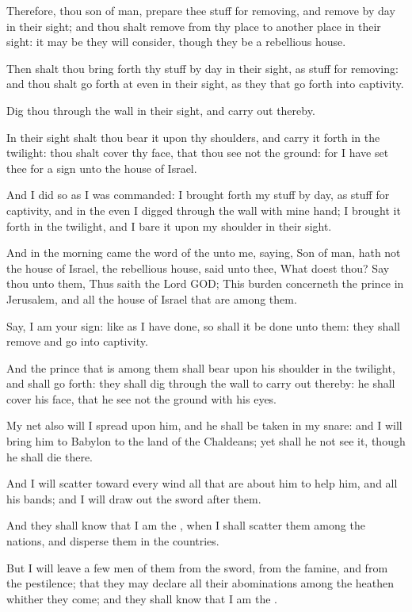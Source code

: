 \verse Therefore, thou son of man, prepare thee stuff for removing, and remove by day in their sight; and thou shalt remove from thy place to another place in their sight: it may be they will consider, though they be a rebellious house.

\verse Then shalt thou bring forth thy stuff by day in their sight, as stuff for removing: and thou shalt go forth at even in their sight, as they that go forth into captivity.

\verse Dig thou through the wall in their sight, and carry out thereby.

\verse In their sight shalt thou bear it upon thy shoulders, and carry it forth in the twilight: thou shalt cover thy face, that thou see not the ground: for I have set thee for a sign unto the house of Israel.

\verse And I did so as I was commanded: I brought forth my stuff by day, as stuff for captivity, and in the even I digged through the wall with mine hand; I brought it forth in the twilight, and I bare it upon my shoulder in their sight.

\verse And in the morning came the word of the \LORD unto me, saying, \verse Son of man, hath not the house of Israel, the rebellious house, said unto thee, What doest thou?  \verse Say thou unto them, Thus saith the Lord GOD; This burden concerneth the prince in Jerusalem, and all the house of Israel that are among them.

\verse Say, I am your sign: like as I have done, so shall it be done unto them: they shall remove and go into captivity.

\verse And the prince that is among them shall bear upon his shoulder in the twilight, and shall go forth: they shall dig through the wall to carry out thereby: he shall cover his face, that he see not the ground with his eyes.

\verse My net also will I spread upon him, and he shall be taken in my snare: and I will bring him to Babylon to the land of the Chaldeans; yet shall he not see it, though he shall die there.

\verse And I will scatter toward every wind all that are about him to help him, and all his bands; and I will draw out the sword after them.

\verse And they shall know that I am the \LORD, when I shall scatter them among the nations, and disperse them in the countries.

\verse But I will leave a few men of them from the sword, from the famine, and from the pestilence; that they may declare all their abominations among the heathen whither they come; and they shall know that I am the \LORD.

